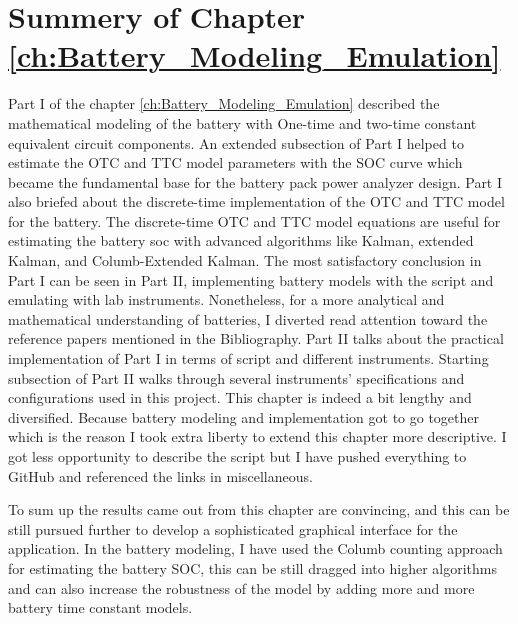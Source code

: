 \section{Summery of Chapter \ref{ch:Battery_Modeling_Emulation}}
Part I of the chapter \ref{ch:Battery_Modeling_Emulation} described the mathematical modeling of the battery with One-time and two-time constant equivalent circuit components. An extended subsection of Part I helped to estimate the OTC and TTC model parameters with the SOC curve which became the fundamental base for the battery pack power analyzer design. Part I also briefed about the discrete-time implementation of the OTC and TTC model for the battery. The discrete-time OTC and TTC model equations are useful for estimating the battery soc with advanced algorithms like Kalman, extended Kalman, and Columb-Extended Kalman. The most satisfactory conclusion in Part I can be seen in Part II, implementing battery models with the script and emulating with lab instruments. Nonetheless, for a more analytical and mathematical understanding of batteries, I diverted read attention toward the reference papers mentioned in the Bibliography. Part II talks about the practical implementation of Part I in terms of script and different instruments. Starting subsection of Part II walks through several instruments' specifications and configurations used in this project. This chapter is indeed a bit lengthy and diversified. Because battery modeling and implementation got to go together which is the reason I took extra liberty to extend this chapter more descriptive.
I got less opportunity to describe the script but I have pushed everything to GitHub and referenced the links in miscellaneous.

To sum up the results came out from this chapter are convincing, and this can be still pursued further to develop a sophisticated graphical interface for the application. In the battery modeling, I have used the Columb counting approach for estimating the battery SOC, this can be still dragged into higher algorithms and can also increase the robustness of the model by adding more and more battery time constant models.